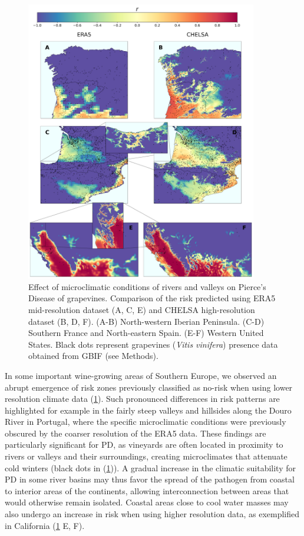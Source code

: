 \begin{figure}[H]
    \centering
    \includegraphics[width=0.9\textwidth]{Figures/ERA5_vs_CHELSA_rivers.pdf}
    \caption[
        Effect of microclimatic conditions of rivers and valleys on PD]{Effect
        of microclimatic conditions of rivers and valleys on
        Pierce's Disease of grapevines. Comparison of the risk predicted using
        ERA5
        mid-resolution dataset (A, C, E) and CHELSA high-resolution dataset
        (B, D, F).
        (A-B) North-western Iberian Peninsula. (C-D) Southern France and
        North-eastern
        Spain. (E-F) Western United States. Black dots represent grapevines
        (\textit{Vitis vinifera}) presence data obtained from GBIF (see
        Methods).}
    \label{fig:microclimates}
\end{figure}

In some important wine-growing areas of
Southern Europe, we observed an abrupt emergence of risk zones previously
classified as no-risk when using lower resolution climate data
(\cref{fig:microclimates}). Such pronounced differences in risk patterns are
highlighted for example in the fairly steep valleys and hillsides along the
Douro River in Portugal, where the specific microclimatic conditions were
previously obscured by the coarser resolution of the ERA5 data. These findings
are particularly significant for PD,  as vineyards are often located in
proximity to rivers or valleys and their surroundings, creating microclimates
that attenuate cold winters (black dots in (\cref{fig:microclimates})). A
gradual increase in the climatic suitability for PD in some river basins may
thus favor the spread of the pathogen from coastal  to interior areas of the
continents, allowing interconnection between areas that would otherwise remain
isolated. Coastal areas close to cool water masses may also undergo an increase
in risk  when using higher resolution data, as exemplified in California
(\cref{fig:microclimates} E, F).

